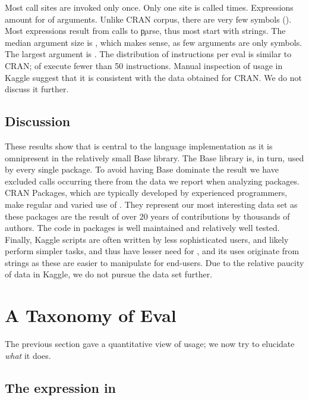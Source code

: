 \documentclass[review,screen,acmsmall,anonymous=true]{acmart}
\begin{document}
Most call sites are invoked only once. Only one site is called \kaggleMaxcalls times.
Expressions amount for \kaggleCodepercent of arguments. Unlike CRAN corpus,
there are very few symbols (\kaggleSymbolpercent). Most expressions result from
calls to \c{parse}, thus most \evals start with strings. The median argument
size is \kaggleMedianszeval, which makes sense, as few arguments are only
symbols. The largest argument is \kaggleMaxszeval. The distribution of
instructions per eval is similar to CRAN; \kaggleSmalleventspct of \evals
execute fewer than 50 instructions. Manual inspection of \eval usage in Kaggle
suggest that it is consistent with the data obtained for CRAN. We do not
discuss it further.


\medskip

\subsection{Discussion}
These results show that \eval is central to the language implementation as it is
omnipresent in the relatively small Base library. The Base library is, in turn,
used by every single package. To avoid having Base dominate the result we have
excluded calls occurring there from the data we report when analyzing packages.
CRAN Packages, which are typically developed by experienced programmers, make
regular and varied use of \eval. They represent our most interesting data set as
these packages are the result of over 20 years of contributions by thousands of
authors. The code in packages is well maintained and relatively well tested.
Finally, Kaggle scripts are often written by less sophisticated users, and
likely perform simpler tasks, and thus have lesser need for \eval, and its uses
originate from strings as these are easier to manipulate for end-users. Due to
the relative paucity of data in Kaggle, we do not pursue the data set further.

\section{A Taxonomy of Eval}

The previous section gave a quantitative view of \eval usage; we now try to
elucidate \emph{what} it does.

\subsection{The expression in \eval} \label{sec:minimized}
\end{document}
